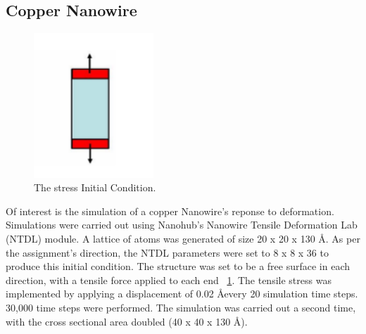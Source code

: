 \documentclass[11pt]{report}
\begin{document}
        \subsection{Copper Nanowire}
        \begin{figure}[!htb]
            \label{fig:applied-stress-partA}
            \centering
            \includegraphics[width=0.4\textwidth]{applied-stress-partA.png}
            \caption{The stress Initial Condition.}
        \end{figure}
        Of interest is the simulation of a copper Nanowire's reponse to deformation.  Simulations were carried out using Nanohub's Nanowire Tensile Deformation Lab (NTDL) module.  A lattice of atoms was generated of size 20 x 20 x 130 \AA. As per the assignment's direction, the NTDL parameters were set to 8 x 8 x 36 to produce this initial condition.  The structure was set to be a free surface in each direction, with a tensile force applied to each end ~\ref{fig:applied-stress-partA}.  The tensile stress was implemented by applying a displacement of 0.02 \AA every 20 simulation time steps. 30,000 time steps were performed.  The simulation was carried out a second time, with the cross sectional area doubled (40 x 40 x 130 \AA).
\end{document}
